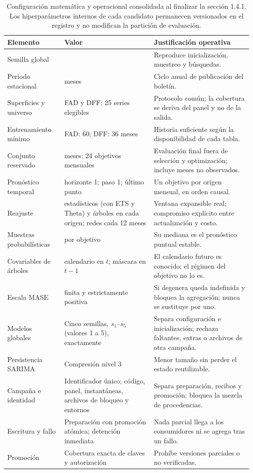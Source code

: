 \documentclass[12pt,letterpaper]{report}
\begin{document}
\begin{table}[htbp]
\centering
\footnotesize
\caption[Configuración consolidada de la implementación]{Configuración matemática y
operacional consolidada al finalizar la sección 1.4.1. Los hiperparámetros internos de cada
candidato permanecen versionados en el registro y no modifican la partición de evaluación.}
\label{tab:config_a10}
\begin{tabular}{@{}>{\RaggedRight\arraybackslash}p{3.3cm}>{\RaggedRight\arraybackslash}p{4.1cm}>{\RaggedRight\arraybackslash}p{6.1cm}@{}}
\toprule
\rowcolor{uacjblue!15}
\textbf{Elemento} & \textbf{Valor} & \textbf{Justificación operativa} \\ \midrule
Semilla global & 42 & Reproduce inicialización, muestreo y búsquedas. \\
Periodo estacional & 12 meses & Ciclo anual de publicación del boletín. \\
Superficies y universo & FAD y DFF; 25 series elegibles & Protocolo común; la cobertura se deriva del panel y no de la salida. \\
Entrenamiento mínimo & FAD: 60; DFF: 36 meses & Historia suficiente según la disponibilidad de cada tabla. \\
Conjunto reservado & 24 meses: 24 objetivos mensuales & Evaluación final fuera de selección y optimización; incluye meses no observados. \\
Pronóstico temporal & horizonte 1; paso 1; último punto & Un objetivo por origen mensual, en orden causal. \\
Reajuste & estadísticos (con ETS y Theta) y árboles en cada origen; redes cada 12 meses & Ventana expansible real; compromiso explícito entre actualización y costo. \\
Muestras probabilísticas & 500 por objetivo & Su mediana es el pronóstico puntual estable. \\
Covariables de árboles & calendario en $t$; máscara en $t-1$ & El calendario futuro es conocido; el régimen del objetivo no lo es. \\
Escala MASE & finita y estrictamente positiva & Si degenera queda indefinida y bloquea la agregación; nunca se sustituye por uno. \\
Modelos globales & Cinco semillas, $s_1$--$s_5$ (valores 1 a 5), exactamente & Separa configuración e inicialización; rechaza faltantes, extras o archivos de otra campaña. \\
Persistencia SARIMA & Compresión nivel 3 & Menor tamaño sin perder el estado reutilizable. \\
Campaña e identidad & Identificador único; código, panel, instantáneas, archivos de bloqueo y entornos & Separa preparación, recibos y promoción; bloquea la mezcla de procedencias. \\
Escritura y fallo & Preparación con promoción atómica; detención inmediata & Nada parcial llega a los consumidores ni se agrega tras un fallo. \\
Promoción & Cobertura exacta de claves y autorización & Prohíbe versiones parciales o no verificadas. \\ \bottomrule
\end{tabular}
\end{table}
\end{document}
